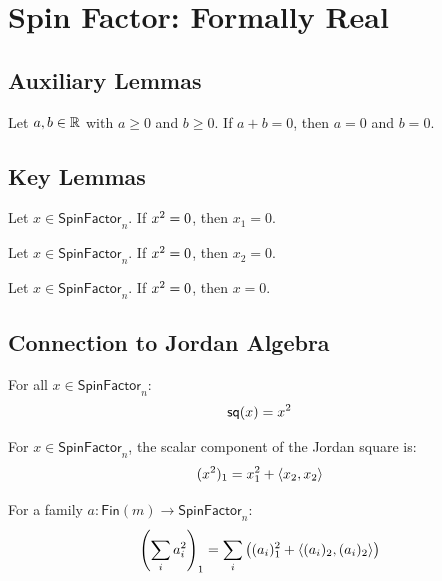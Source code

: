 \section{Spin Factor: Formally Real}

\subsection{Auxiliary Lemmas}

\begin{lemma}
Let $a, b \in \mathbb{R}$ with $a \ge 0$ and $b \ge 0$. If $a + b = 0$, then $a = 0$ and $b = 0$.
\end{lemma}

\subsection{Key Lemmas}

\begin{theorem}
Let $x \in \mathsf{SpinFactor}_n$. If $x^{2} = 0$, then $x_1 = 0$.
\end{theorem}

\begin{theorem}
Let $x \in \mathsf{SpinFactor}_n$. If $x^{2} = 0$, then $x_2 = 0$.
\end{theorem}

\begin{theorem}
Let $x \in \mathsf{SpinFactor}_n$. If $x^{2} = 0$, then $x = 0$.
\end{theorem}

\subsection{Connection to Jordan Algebra}

\begin{lemma}[sq\_eq\_jsq]
For all $x \in \mathsf{SpinFactor}_n$:
\[ \mathsf{sq}(x) = x^{2} \]
\end{lemma}

\begin{theorem}
For $x \in \mathsf{SpinFactor}_n$, the scalar component of the Jordan square is:
\[ (x^{2})_1 = x_1^2 + \langle x_2, x_2 \rangle \]
\end{theorem}

\begin{theorem}
For a family $a : \mathsf{Fin}(m) \to \mathsf{SpinFactor}_n$:
\[ \left( \sum_{i} a_i^{2} \right)_1 = \sum_{i} \left( (a_i)_1^2 + \langle (a_i)_2, (a_i)_2 \rangle \right) \]
\end{theorem}

